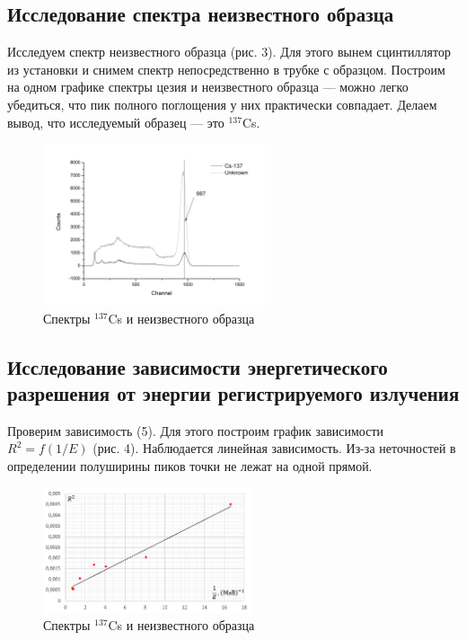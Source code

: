 \documentclass[a4paper]{article}
\begin{document}
\newpage

\subsection{Исследование спектра неизвестного образца}

\noindent Исследуем спектр неизвестного образца (рис. 3). Для этого вынем сцинтиллятор из установки и снимем спектр непосредственно в трубке с образцом. Построим на одном графике спектры цезия и неизвестного образца --- можно легко убедиться, что пик полного поглощения у них практически совпадает. Делаем вывод, что исследуемый образец --- это $^{137}$Cs.

\begin{figure}[!ht]
    \begin{center}
        \includegraphics[width = 0.6\textwidth]{image/unknown.png}
        \caption{Спектры $^{137}$Cs и неизвестного образца}
    \end{center}
\end{figure}

\subsection{Исследование зависимости энергетического разрешения от энергии регистрируемого излучения}

\noindent Проверим зависимость (5). Для этого построим график зависимости $R^2 = f(1/E)$ (рис. 4). Наблюдается линейная зависимость. Из-за неточностей в определении полуширины пиков точки не лежат на одной прямой.

\begin{figure}[!ht]
    \begin{center}
        \includegraphics[width = 0.55\textwidth]{image/gr2.png}
        \caption{Спектры $^{137}$Cs и неизвестного образца}
    \end{center}
\end{figure}
\end{document}
